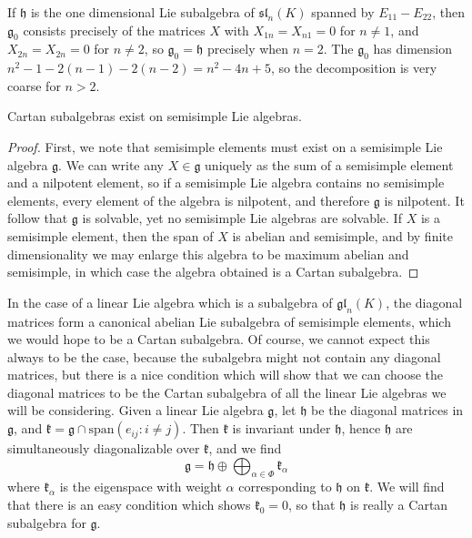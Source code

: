 \begin{example}
    If $\mathfrak{h}$ is the one dimensional Lie subalgebra of $\mathfrak{sl}_n(K)$ spanned by $E_{11} - E_{22}$, then $\mathfrak{g}_0$ consists precisely of the matrices $X$ with $X_{1n} = X_{n1} = 0$ for $n \neq 1$, and $X_{2n} = X_{2n} = 0$ for $n \neq 2$, so $\mathfrak{g}_0 = \mathfrak{h}$ precisely when $n = 2$. The $\mathfrak{g}_0$ has dimension $n^2 - 1 - 2(n-1) - 2(n-2) = n^2 - 4n + 5$, so the decomposition is very coarse for $n > 2$.
\end{example}

\begin{theorem}
    Cartan subalgebras exist on semisimple Lie algebras.
\end{theorem}
\begin{proof}
    First, we note that semisimple elements must exist on a semisimple Lie algebra $\mathfrak{g}$. We can write any $X \in \mathfrak{g}$ uniquely as the sum of a semisimple element and a nilpotent element, so if a semisimple Lie algebra contains no semisimple elements, every element of the algebra is nilpotent, and therefore $\mathfrak{g}$ is nilpotent. It follow that $\mathfrak{g}$ is solvable, yet no semisimple Lie algebras are solvable. If $X$ is a semisimple element, then the span of $X$ is abelian and semisimple, and by finite dimensionality we may enlarge this algebra to be maximum abelian and semisimple, in which case the algebra obtained is a Cartan subalgebra.
\end{proof}

In the case of a linear Lie algebra which is a subalgebra of $\mathfrak{gl}_n(K)$, the diagonal matrices form a canonical abelian Lie subalgebra of semisimple elements, which we would hope to be a Cartan subalgebra. Of course, we cannot expect this always to be the case, because the subalgebra might not contain any diagonal matrices, but there is a nice condition which will show that we can choose the diagonal matrices to be the Cartan subalgebra of all the linear Lie algebras we will be considering. Given a linear Lie algebra $\mathfrak{g}$, let $\mathfrak{h}$ be the diagonal matrices in $\mathfrak{g}$, and $\mathfrak{k} = \mathfrak{g} \cap \text{span}(e_{ij}: i \neq j)$. Then $\mathfrak{k}$ is invariant under $\mathfrak{h}$, hence $\mathfrak{h}$ are simultaneously diagonalizable over $\mathfrak{k}$, and we find
%
\[ \mathfrak{g} = \mathfrak{h} \oplus \bigoplus_{\alpha \in \Phi} \mathfrak{k}_\alpha \]
%
where $\mathfrak{k}_\alpha$ is the eigenspace with weight $\alpha$ corresponding to $\mathfrak{h}$ on $\mathfrak{k}$. We will find that there is an easy condition which shows $\mathfrak{k}_0 = 0$, so that $\mathfrak{h}$ is really a Cartan subalgebra for $\mathfrak{g}$.

